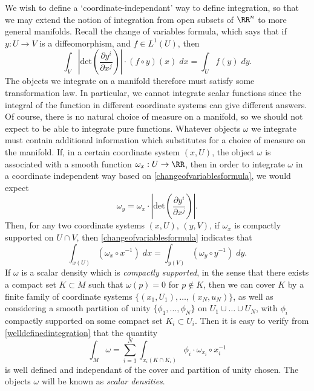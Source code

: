We wish to define a `coordinate-independant' way to define integration, so that we may extend the notion of integration from open subsets of $\RR^n$ to more general manifolds. Recall the change of variables formula, which says that if $y: U \to V$ is a diffeomorphism, and $f \in L^1(U)$, then
%
\begin{equation} \label{changeofvariablesformula}
    \int_V \left|\text{det} \left( \frac{\partial y^i}{\partial x^j} \right) \right| \cdot (f \circ y)(x)\; dx = \int_U f(y)\; dy.
\end{equation}
%
The objects we integrate on a manifold therefore must satisfy some transformation law. In particular, we cannot integrate scalar functions since the integral of the function in different coordinate systems can give different answers. Of course, there is no natural choice of measure on a manifold, so we should not expect to be able to integrate pure functions. Whatever objects $\omega$ we integrate must contain additional information which substitutes for a choice of measure on the manifold. If, in a certain coordinate system $(x,U)$, the object $\omega$ is associated with a smooth function $\omega_x: U \to \RR$, then in order to integrate $\omega$ in a coordinate independent way based on \eqref{changeofvariablesformula}, we would expect
%
\begin{equation}
    \omega_y = \omega_x \cdot \left| \text{det} \left( \frac{\partial y^i}{\partial x^j} \right) \right|.
\end{equation}
%
Then, for any two coordinate systems $(x,U)$, $(y,V)$, if $\omega_x$ is compactly supported on $U \cap V$, then \eqref{changeofvariablesformula} indicates that
%
\begin{equation} \label{welldefinedintegration}
    \int_{x(U)} (\omega_x \circ x^{-1})\; dx = \int_{y(V)} (\omega_y \circ y^{-1})\; dy.
\end{equation}
%
If $\omega$ is a scalar density which is \emph{compactly supported}, in the sense that there exists a compact set $K \subset M$ such that $\omega(p) = 0$ for $p \not \in K$, then we can cover $K$ by a finite family of coordinate systems $\{ (x_1,U_1), \dots, (x_N,u_N) \}$, as well as considering a smooth partition of unity $\{ \phi_1, \dots, \phi_N \}$ on $U_1 \cup \dots \cup U_N$, with $\phi_i$ compactly supported on some compact set $K_i \subset U_i$. Then it is easy to verify from \eqref{welldefinedintegration} that the quantity
%
\begin{equation} \label{integration}
    \int_M \omega = \sum_{i = 1}^N \int_{x_i(K \cap K_i)} \phi_i \cdot \omega_{x_i} \circ x_i^{-1}
\end{equation}
%
is well defined and independant of the cover and partition of unity chosen. The objects $\omega$ will be known as {\it scalar densities}.

